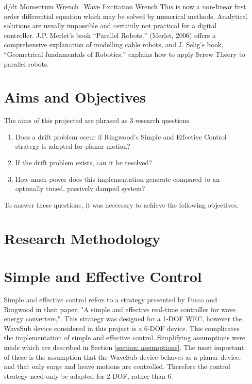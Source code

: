 \documentclass{report}
\begin{document}
d/dt Momentum Wrench=Wave Excitation Wrench
This is now a non-linear first order differential equation which may be solved by numerical methods. Analytical solutions are usually impossible and certainly not practical for a digital controller.
J.P. Merlet’s book “Parallel Robots,” (Merlet, 2006) offers a comprehensive explanation of modelling cable robots, and J. Selig’s book, “Geometrical fundamentals of Robotics,” explains how to apply Screw Theory to parallel robots.

\chapter{Aims and Objectives}
The aims of this projected are phrased as 3 research questions.
\begin{enumerate}
\item{Does a drift problem occur if Ringwood's Simple and Effective Control strategy is adapted for planar motion?}
\item{If the drift problem exists, can it be resolved?}
\item{How much power does this implementation generate compared to an optimally tuned, passively damped system?}
\end{enumerate}

To answer these questions, it was necessary to achieve the following objectives.

\chapter{Research Methodology}

\chapter{Simple and Effective Control}
Simple and effective control refers to a strategy presented by Fusco and Ringwood in their paper, "A simple and effective real-time controller for wave energy converters,"\cite{ringwood}. This strategy was designed for a 1-DOF WEC, however the WaveSub device considered in this project is a 6-DOF device. This complicates the implementation of simple and effective control. Simplifying assumptions were made which are described in Section \ref{section: assumptions}. The most important of these is the assumption that the WaveSub device behaves as a planar device, and that only surge and heave motions are controlled. Therefore the control strategy need only be adapted for 2 DOF, rather than 6.
\end{document}
